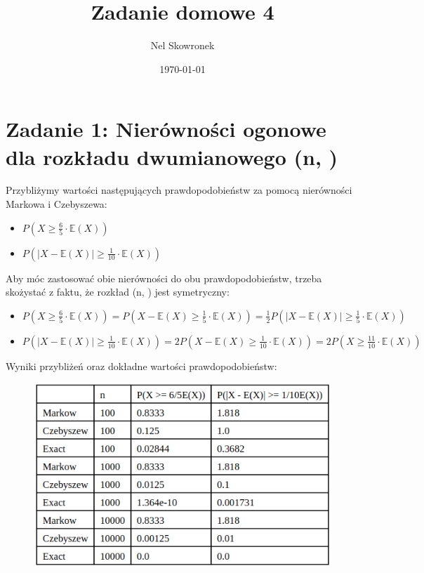 \documentclass{article}
\title{Zadanie domowe 4}
\author{Nel Skowronek}
\date{\today}
\begin{document}
\maketitle

\section*{Zadanie 1: Nierówności ogonowe dla rozkładu dwumianowego \left(n, \right)}

Przybliżymy wartości następujących prawdopodobieństw za pomocą nierówności Markowa i Czebyszewa:
\begin{itemize}
    \item \( P\left(X \geq \frac{6}{5} \cdot \mathbb{E}(X)\right) \)
    \item \( P\left(\left|X - \mathbb{E}(X)\right| \geq \frac{1}{10} \cdot \mathbb{E}(X) \right) \)
\end{itemize}
Aby móc zastosować obie nierówności do obu prawdopodobieństw, trzeba skożystać z faktu, że rozkład \left(n, \right) jest symetryczny:
\begin{itemize}
    \item \( P\left(X \geq \frac{6}{5} \cdot \mathbb{E}(X)\right) = P\left(X - \mathbb{E}(X) \geq \frac{1}{5} \cdot \mathbb{E}(X)\right) = \frac{1}{2}P\left(\left|X - \mathbb{E}(X)\right| \geq \frac{1}{5} \cdot \mathbb{E}(X)\right) \)
    \item \( P\left(\left|X - \mathbb{E}(X) \right| \geq \frac{1}{10} \cdot \mathbb{E}(X) \right) = 2P\left(X - \mathbb{E}(X) \geq \frac{1}{10} \cdot \mathbb{E}(X) \right) = 2P\left(X \geq \frac{11}{10} \cdot \mathbb{E}(X) \right) \)
\end{itemize}

Wyniki przybliżeń oraz dokładne wartości prawdopodobieństw:
\begin{figure}[h!]
    \centering
    \includegraphics[scale=0.5]{./plots/exc1.png}
\end{figure}
\end{document}

